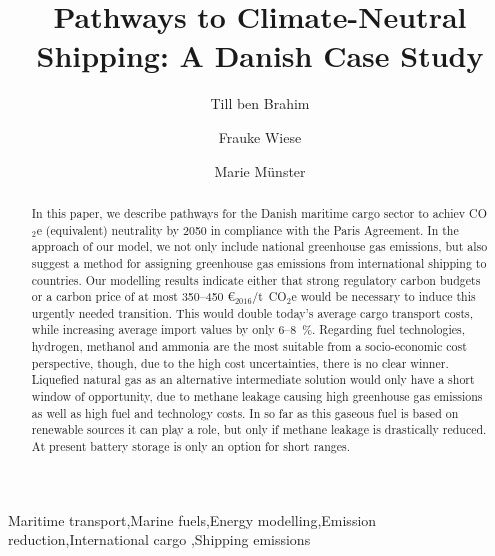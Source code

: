 \documentclass[article]{elsarticle}
\begin{document}
\begin{frontmatter}

\title{Pathways to Climate-Neutral Shipping: A Danish Case Study}


\author[label1]{Till ben Brahim}
\address[label1]{Technical University of Denmark, Produktionstorvet 426, 2800 Kongens Lyngby, Denmark}


\author[label1]{Frauke Wiese}

\author[label1]{Marie M\"unster}

\begin{abstract}
In this paper, we describe pathways for the Danish maritime cargo sector to achiev CO$_2$e (equivalent) neutrality by 2050 in compliance with the Paris Agreement. In the approach of our model, we not only include national greenhouse gas emissions, but also suggest a method for assigning greenhouse gas emissions from international shipping to countries.
Our modelling results indicate either that strong regulatory carbon budgets or a carbon price of at most 350--450 \euro$_{2016}$/t~CO$_2$e would be necessary to induce this urgently needed transition. This would double today's average cargo transport costs, while increasing average import values by only 6--8~\%.
Regarding fuel technologies, hydrogen, methanol and ammonia are the most suitable from a socio-economic cost perspective, though, due to the high cost uncertainties, there is no clear winner.
Liquefied natural gas as an alternative intermediate solution would only have a short window of opportunity, due to methane leakage causing high greenhouse gas emissions as well as high fuel and technology costs. In so far as this gaseous fuel is based on renewable sources it can play a role, but only if methane leakage is drastically reduced. At present battery storage is only an option for short ranges.
\end{abstract}

\begin{keyword}
Maritime transport\sep Marine fuels\sep Energy modelling\sep Emission reduction\sep International cargo \sep Shipping emissions
\end{keyword}

\end{frontmatter}
\end{document}
